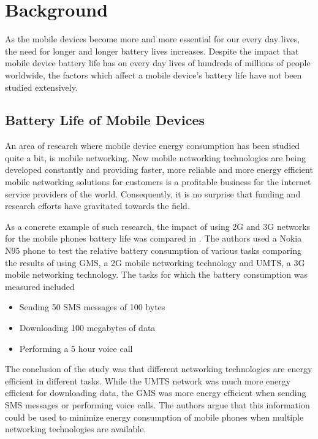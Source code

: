 \section{Background}

As the mobile devices become more and more essential for our every day lives, the need for longer and longer battery lives increases. Despite the impact that mobile device battery life has on every day lives of hundreds of millions of people worldwide, the factors which affect a mobile device's battery life have not been studied extensively.        

\subsection{Battery Life of Mobile Devices}
An area of research where mobile device energy consumption has been studied quite a bit, is mobile networking. New mobile networking technologies are being developed constantly and providing faster, more reliable and more energy efficient mobile networking solutions for customers is a profitable business for the internet service providers of the world. Consequently, it is no surprise that funding and research efforts have gravitated towards the field.  

As a concrete example of such research, the impact of using 2G and 3G networks for the mobile phones battery life was compared in \cite{5357972}. The authors used a Nokia N95 phone to test the relative battery consumption of various tasks comparing the results of using GMS, a 2G mobile networking technology and UMTS, a 3G mobile networking technology. The tasks for which the battery consumption was measured included 

\begin{itemize}
\item Sending 50 SMS messages of 100 bytes
\item Downloading 100 megabytes of data
\item Performing a 5 hour voice call 
\end{itemize} 

The conclusion of the study was that different networking technologies are energy efficient in different tasks. While the UMTS network was much more energy efficient for downloading data, the GMS was more energy efficient when sending SMS messages or performing voice calls. The authors argue that this information could be used to minimize energy consumption of mobile phones when multiple networking technologies are available.      

